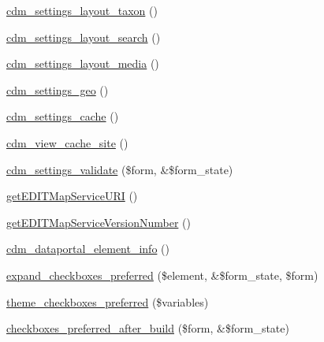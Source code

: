 \begin{DoxyCompactItemize}
\hyperlink{settings_8php_ab2641ddc8fc000e9ccb64f3ae3db67dd}{cdm\-\_\-settings\-\_\-layout\-\_\-taxon} ()
\item 
\hyperlink{settings_8php_ab0d387d6f5390e0a7d18480c464cc186}{cdm\-\_\-settings\-\_\-layout\-\_\-search} ()
\item 
\hyperlink{settings_8php_ad04830ecc109e419dab7ce9ec775d498}{cdm\-\_\-settings\-\_\-layout\-\_\-media} ()
\item 
\hyperlink{settings_8php_a4455a01b680b2e33cf06cf4a790ab01b}{cdm\-\_\-settings\-\_\-geo} ()
\item 
\hyperlink{settings_8php_a6b007fdce3ad1dff4a3c07a146f30038}{cdm\-\_\-settings\-\_\-cache} ()
\item 
\hyperlink{settings_8php_a8394ada1e39276bdf416788798d07d9b}{cdm\-\_\-view\-\_\-cache\-\_\-site} ()
\item 
\hyperlink{settings_8php_a607d28d4bba2141a0bffde4b34181505}{cdm\-\_\-settings\-\_\-validate} (\$form, \&\$form\-\_\-state)
\item 
\hyperlink{settings_8php_aa3784149590edb223228eac3f8b57efe}{get\-E\-D\-I\-T\-Map\-Service\-U\-R\-I} ()
\item 
\hyperlink{settings_8php_a7e06996b60ea5a7b37544dae04e8035c}{get\-E\-D\-I\-T\-Map\-Service\-Version\-Number} ()
\item 
\hyperlink{settings_8php_a888fce3c9ba3f3abf673c1c46f73cbdf}{cdm\-\_\-dataportal\-\_\-element\-\_\-info} ()
\item 
\hyperlink{settings_8php_a5f83fcc5e0f91f3126b9feaed83f1b4a}{expand\-\_\-checkboxes\-\_\-preferred} (\$element, \&\$form\-\_\-state, \$form)
\item 
\hyperlink{settings_8php_a18a9a67e442c9e18af01bf8a90e01b0d}{theme\-\_\-checkboxes\-\_\-preferred} (\$variables)
\item 
\hyperlink{settings_8php_ab51f397ae011891adc151c40b3574218}{checkboxes\-\_\-preferred\-\_\-after\-\_\-build} (\$form, \&\$form\-\_\-state)
\end{DoxyCompactItemize}
